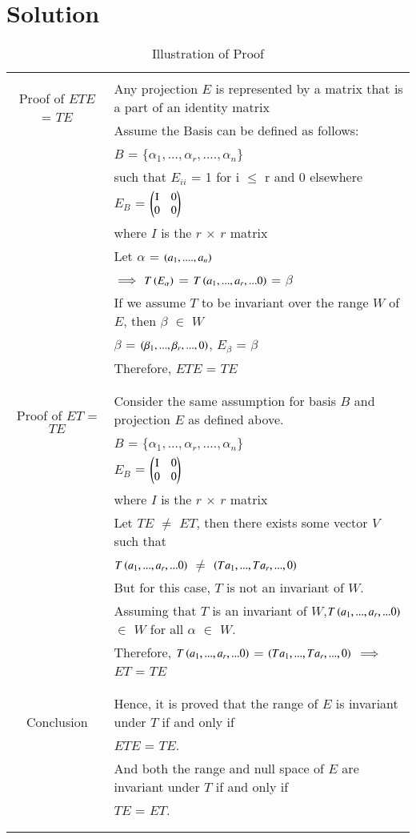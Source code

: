 \documentclass[journal,12pt]{IEEEtran}
\begin{document}
\section{\textbf{Solution}}
\renewcommand{\thetable}{1}
\begin{longtable}{|c|l|}
    \hline
	\multirow{3}{*}{Proof of $ETE$ = $TE$} 
	& \\
	& Any projection $E$ is represented by a matrix that is a part of an identity matrix\\
	& Assume the Basis can be defined as follows:\\
	& $B$ = $\{\alpha_1,...,\alpha_r,....,\alpha_n\}$\\
	& such that $E_{ii}$ = 1 for i $\le$ r and 0 elsewhere\\
	& $E_{B}$ = $\myvec{$I$ & 0 \\ 0 & 0}$\\
	& where $I$ is the $r$ $\times$ $r$ matrix\\
	& Let $\alpha$ = $\left(a_1,....,a_n\right)$\\
	& $\implies$ $T\left(E_{\alpha}\right)$ = $T\left(a_1,...,a_r,...0\right)$ = $\beta$ \\
	& If we assume $T$ to be invariant over the range $W$ of $E$, then $\beta$ $\in$ $W$ \\
	& $\beta$ = $\left(\beta_1,...,\beta_r,...,0\right)$, $E_{\beta}$ = $\beta$\\
	& Therefore, $ETE$ = $TE$ \\
	&\\
	\hline
	\multirow{3}{*}{Proof of $ET$ = $TE$} 
	& \\
	& Consider the same assumption for basis $B$ and projection $E$ as defined above.\\
	& $B$ = $\{\alpha_1,...,\alpha_r,....,\alpha_n\}$\\
	& $E_{B}$ = $\myvec{$I$ & 0 \\ 0 & 0}$\\
	& where $I$ is the $r$ $\times$ $r$ matrix\\
	& Let $TE$ $\ne$ $ET$, then there exists some vector $V$ such that \\
	& $T\left(a_1,...,a_r,...0\right)$ $\ne$ $\left(Ta_1,...,Ta_r,...,0\right)$\\
	& But for this case, $T$ is not an invariant of $W$.\\
	& Assuming that $T$ is an invariant of $W$,$T\left(a_1,...,a_r,...0\right)$ $\in$ $W$ for all $\alpha$ $\in$ $W$.\\
	& Therefore, $T\left(a_1,...,a_r,...0\right)$ = $\left(Ta_1,...,Ta_r,...,0\right)$ $\implies$ $ET$ = $TE$\\
	&\\
	\hline
	\multirow{3}{*}{Conclusion} & \\
	& Hence, it is proved that the range of $E$ is invariant under $T$ if and only if\\
	& $ETE$ = $TE$.\\
	& And both the range and null space of $E$ are invariant under $T$ if and only if\\
	& $TE$ = $ET$.\\
	&\\
	\hline
	\caption{Illustration of Proof}
    \label{table:1}
\end{longtable}
\end{document}

